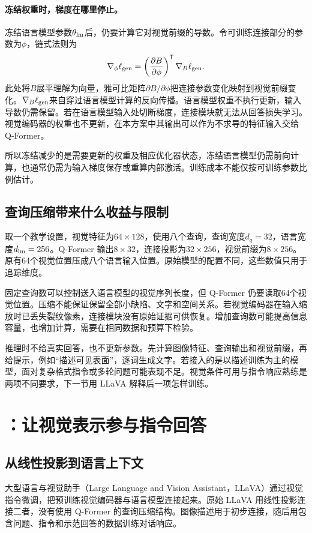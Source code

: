 \paragraph{冻结权重时，梯度在哪里停止。}
冻结语言模型参数$\theta_{\rm lm}$后，仍要计算它对视觉前缀的导数。令可训练连接部分的参数为$\phi$，链式法则为
\begin{equation}
 \nabla_\phi\ell_{\rm gen}
 =\left(\frac{\partial B}{\partial\phi}\right)^{\mathsf T}
 \nabla_B\ell_{\rm gen}.
\end{equation}
此处将$B$展平理解为向量，雅可比矩阵$\partial B/\partial\phi$把连接参数变化映射到视觉前缀变化。$\nabla_B\ell_{\rm gen}$来自穿过语言模型计算的反向传播。语言模型权重不执行更新，输入导数仍需保留。若在语言模型输入处切断梯度，连接模块就无法从回答损失学习。视觉编码器的权重也不更新，在本方案中其输出可以作为不求导的特征输入交给 Q-Former。

所以冻结减少的是需要更新的权重及相应优化器状态，冻结语言模型仍需前向计算，也通常仍需为输入梯度保存或重算内部激活。训练成本不能仅按可训练参数比例估计。

\subsection{查询压缩带来什么收益与限制}
取一个教学设置，视觉特征为$64\times128$，使用八个查询，查询宽度$d_q=32$，语言宽度$d_{\rm lm}=256$。Q-Former 输出$8\times32$，连接投影为$32\times256$，视觉前缀为$8\times256$。原有64个视觉位置压成八个语言输入位置。原始模型的配置不同，这些数值只用于追踪维度。

固定查询数可以控制送入语言模型的视觉序列长度，但 Q-Former 仍要读取64个视觉位置。压缩不能保证保留全部小缺陷、文字和空间关系。若视觉编码器在输入缩放时已丢失裂纹像素，连接模块没有原始证据可供恢复。增加查询数可能提高信息容量，也增加计算，需要在相同数据和预算下检验。

推理时不给真实回答，也不更新参数。先计算图像特征、查询输出和视觉前缀，再给提示，例如“描述可见表面”，逐词生成文字。若接入的是以描述训练为主的模型，面对复杂格式指令或多轮问题可能表现不足。视觉条件可用与指令响应熟练是两项不同要求，下一节用 LLaVA 解释后一项怎样训练。

\section{\texorpdfstring{}{LLaVA}：让视觉表示参与指令回答}
\subsection{从线性投影到语言上下文}
大型语言与视觉助手（Large Language and Vision Assistant，LLaVA）通过视觉指令微调，把预训练视觉编码器与语言模型连接起来。原始 LLaVA 用线性投影连接二者，没有使用 Q-Former 的查询压缩结构。图像描述用于初步连接，随后用包含问题、指令和示范回答的数据训练对话响应。

